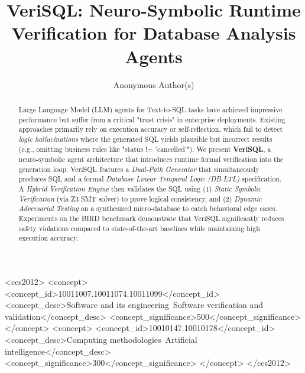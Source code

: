 \documentclass[sigconf,review,anonymous]{acmart}
\begin{document}
\title{VeriSQL: Neuro-Symbolic Runtime Verification for Database Analysis Agents}

\author{Anonymous Author(s)}

\renewcommand{\shortauthors}{Anonymous}

\begin{abstract}
Large Language Model (LLM) agents for Text-to-SQL tasks have achieved impressive performance but suffer from a critical "trust crisis" in enterprise deployments. Existing approaches primarily rely on execution accuracy or self-reflection, which fail to detect \textit{logic hallucinations} where the generated SQL yields plausible but incorrect results (e.g., omitting business rules like "status != 'cancelled'"). We present \textbf{VeriSQL}, a neuro-symbolic agent architecture that introduces runtime formal verification into the generation loop. VeriSQL features a \textit{Dual-Path Generator} that simultaneously produces SQL and a formal \textit{Database Linear Temporal Logic (DB-LTL)} specification. A \textit{Hybrid Verification Engine} then validates the SQL using (1) \textit{Static Symbolic Verification} (via Z3 SMT solver) to prove logical consistency, and (2) \textit{Dynamic Adversarial Testing} on a synthesized micro-database to catch behavioral edge cases. Experiments on the BIRD benchmark demonstrate that VeriSQL significantly reduces safety violations compared to state-of-the-art baselines while maintaining high execution accuracy.
\end{abstract}

\begin{CCSXML}
<ccs2012>
   <concept>
       <concept_id>10011007.10011074.10011099</concept_id>
       <concept_desc>Software and its engineering~Software verification and validation</concept_desc>
       <concept_significance>500</concept_significance>
       </concept>
   <concept>
       <concept_id>10010147.10010178</concept_id>
       <concept_desc>Computing methodologies~Artificial intelligence</concept_desc>
       <concept_significance>300</concept_significance>
       </concept>
 </ccs2012>
\end{CCSXML}


\end{document}

